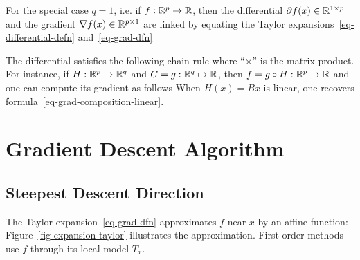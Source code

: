 For the special case $q=1$, i.e. if $f : \mathbb{R}^p \rightarrow \mathbb{R}$, then the differential $\partial f(x) \in \mathbb{R}^{1 \times p}$ and the gradient $\nabla f(x) \in \mathbb{R}^{p \times 1}$ are linked by equating the Taylor expansions~\eqref{eq-differential-defn} and~\eqref{eq-grad-dfn}

The differential satisfies the following chain rule 
where ``$\times$'' is the matrix product. For instance, if $H : \mathbb{R}^p \rightarrow \mathbb{R}^q$ and $G = g : \mathbb{R}^q \mapsto \mathbb{R}$, then $f = g \circ H : \mathbb{R}^p \rightarrow \mathbb{R}$ and one can compute its gradient as follows
When $H(x)=Bx$ is linear, one recovers formula~\eqref{eq-grad-composition-linear}.


\section{Gradient Descent Algorithm}
\label{sec-grad-desc-basic}


\subsection{Steepest Descent Direction}

The Taylor expansion~\eqref{eq-grad-dfn} approximates $f$ near $x$ by an affine function:
Figure~\ref{fig-expansion-taylor} illustrates the approximation. First-order methods use $f$ through its local model $T_x$.


